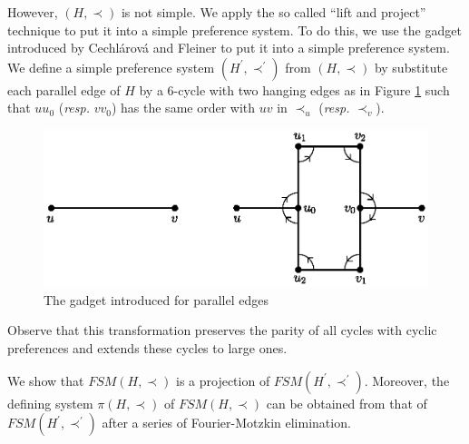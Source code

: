 \documentclass[11pt]{article}
\numberwithin{theorem}{section}
\begin{document}
However, $(H,\prec)$ is not simple.
We apply the so called ``lift and project'' technique to put it into a simple preference system.
To do this, we use the gadget introduced by Cechl\'{a}rov\'{a} and Fleiner \cite{CechFlei05} to put it into a simple preference system.
We define a simple preference system $(H^\prime,\prec^\prime)$ from $(H,\prec)$
by substitute each parallel edge of $H$ by a $6$-cycle with two hanging edges as in Figure \ref{gadget}
such that $u u_0$ (\textit{resp.} $v v_0$) has the same order with $u v$ in $\prec_u$ (\textit{resp.} $\prec_v$).
\begin{figure}
\centering
  \includegraphics[width=.65\linewidth]{KernelMengerian-gadget}
  \caption{The gadget introduced for parallel edges}
  \label{gadget}
\end{figure}
Observe that this transformation preserves the parity of all cycles with cyclic preferences and extends these cycles to large ones.

We show that $FSM(H,\prec)$ is a projection of $FSM(H^\prime,\prec^\prime)$.
Moreover, the defining system $\pi(H,\prec)$ of $FSM(H,\prec)$ can be obtained from that of $FSM(H^\prime,\prec^\prime)$ after a series of Fourier-Motzkin elimination.
\end{document}
